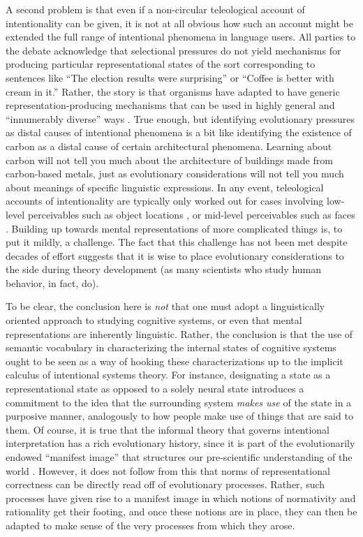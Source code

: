 A second problem is that even if a non-circular teleological account of intentionality can be given, it is not at all obvious how such an account might be extended the full range of intentional phenomena in language users. All parties to the debate acknowledge that selectional pressures do not yield mechanisms for producing particular representational states of the sort corresponding to sentences like ``The election results were surprising'' or ``Coffee is better with cream in it.'' Rather, the story is that organisms have adapted to have generic representation-producing mechanisms that can be used in highly general and ``innumerably diverse'' ways \citep[][p. 292]{Millikan:1989}. True enough, but identifying evolutionary pressures as distal causes of intentional phenomena is a bit like identifying the existence of carbon as a distal cause of certain architectural phenomena. Learning about carbon will not tell you much about the architecture of buildings made from carbon-based metals, just as evolutionary considerations will not tell you much about meanings of specific linguistic expressions. In any event, teleological accounts of intentionality are typically only worked out for cases involving low-level perceivables such as object locations \citep{Millikan:1989}, or mid-level perceivables such as faces \citep{Dennett:1987}. Building up towards mental representations of more complicated things is, to put it mildly, a challenge. The fact that this challenge has not been met despite decades of effort suggests that it is wise to place evolutionary considerations to the side during theory development (as many scientists who study human behavior, in fact, do). 

To be clear, the conclusion here is \textit{not} that one must adopt a linguistically oriented approach to studying cognitive systems, or even that mental representations are inherently linguistic. Rather, the conclusion is that the use of semantic vocabulary in characterizing the internal states of cognitive systems ought to be seen as a way of hooking these characterizations up to the implicit calculus of intentional systems theory. For instance, designating a state as a representational state as opposed to a solely neural state introduces a commitment to the idea that the surrounding system \textit{makes use} of the state in a purposive manner, analogously to how people make use of things that are said to them. Of course, it is true that the informal theory that governs intentional interpretation has a rich evolutionary history, since it is part of the evolutionarily endowed ``manifest image'' \citep{Sellars:1963} that structures our pre-scientific understanding of the world \citep{Dennett:1987}. However, it does not follow from this that norms of representational correctness can be directly read off of evolutionary processes. Rather, such processes have given rise to a manifest image in which notions of normativity and rationality get their footing, and once these notions are in place, they can then be adapted to make sense of the very processes from which they arose.

